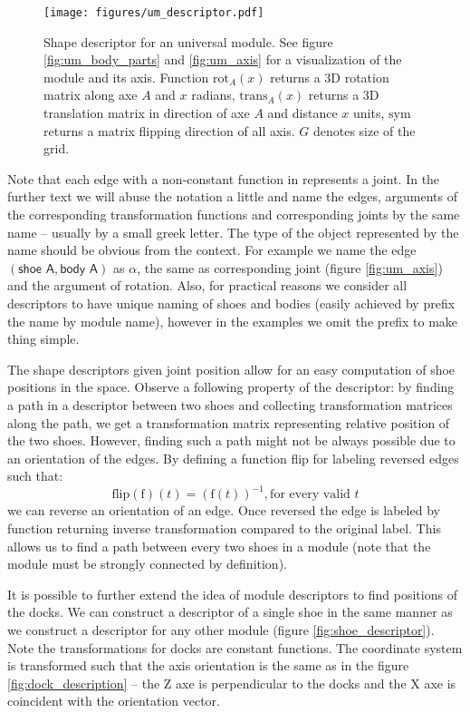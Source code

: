 \begin{figure}[h!]
    \centering
    \texttt{[image: figures/um\_descriptor.pdf]}
    \caption{Shape descriptor for an universal module. See figure
    \ref{fig:um_body_parts} and \ref{fig:um_axis} for a visualization of the
    module and its axis. Function $\text{rot}_A(x)$ returns a 3D rotation matrix
    along axe $A$ and $x$ radians, $\text{trans}_A(x)$ returns a 3D translation
    matrix in direction of axe $A$ and distance $x$ units, $\text{sym}$ returns
    a matrix flipping direction of all axis. $G$ denotes size of the grid.}
    \label{fig:um_descriptor}
\end{figure}

Note that each edge with a non-constant function in represents a joint. In the
further text we will abuse the notation a little and name the edges, arguments
of the corresponding transformation functions and corresponding joints by the
same name -- usually by a small greek letter. The type of the object represented
by the name should be obvious from the context. For example we name the edge
$(\textsf{shoe A}, \textsf{body A})$ as $\alpha$, the same as corresponding
joint (figure \ref{fig:um_axis}) and the argument of rotation. Also, for
practical reasons we consider all descriptors to have unique naming of shoes and
bodies (easily achieved by prefix the name by module name), however in the
examples we omit the prefix to make thing simple.

The shape descriptors given joint position allow for an easy computation of shoe
positions in the space. Observe a following property of the descriptor: by
finding a path in a descriptor between two shoes and collecting transformation
matrices along the path, we get a transformation matrix representing relative
position of the two shoes. However, finding such a path might not be always
possible due to an orientation of the edges. By defining a function flip for
labeling reversed edges such that:
\[\text{flip}(\text{f})(t) = (\text{f}(t))^{-1}, \text{for every valid } t\] we
can reverse an orientation of an edge. Once reversed the edge is labeled by
function returning inverse transformation compared to the original label. This
allows us to find a path between every two shoes in a module (note that the
module must be strongly connected by definition).

It is possible to  further extend the idea of module descriptors to find
positions of the docks.  We can construct a descriptor of a single shoe in the
same manner as we construct a descriptor for any other module (figure
\ref{fig:shoe_descriptor}). Note the transformations for docks are constant
functions. The coordinate system is transformed such that the axis orientation
is the same as in the figure \ref{fig:dock_description} -- the Z axe is
perpendicular to the docks and the X axe is coincident with the orientation
vector.

